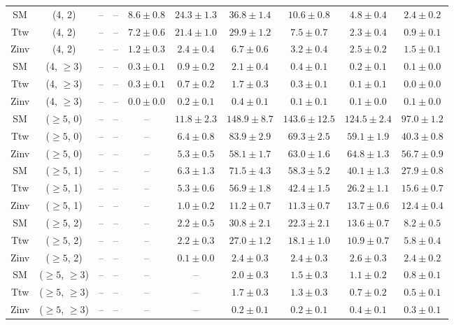 \begin{table}[h!]
{\begin{tabular}{cccccccccc}
	SM & (4, 2) & -- & -- & $8.6\pm 0.8$ & $24.3\pm 1.3$ & $36.8\pm 1.4$ & $10.6\pm 0.8$ & $4.8\pm 0.4$ & $2.4\pm 0.2$ \\[0.5ex] 
	Ttw & (4, 2) & -- & -- & $7.2\pm 0.6$ & $21.4\pm 1.0$ & $29.9\pm 1.2$ & $7.5\pm 0.7$ & $2.3\pm 0.4$ & $0.9\pm 0.1$ \\[0.5ex] 
	Zinv & (4, 2) & -- & -- & $1.2\pm 0.3$ & $2.4\pm 0.4$ & $6.7\pm 0.6$ & $3.2\pm 0.4$ & $2.5\pm 0.2$ & $1.5\pm 0.1$ \\[0.5ex] 
	SM & (4, $\ge3$) & -- & -- & $0.3\pm 0.1$ & $0.9\pm 0.2$ & $2.1\pm 0.4$ & $0.4\pm 0.1$ & $0.2\pm 0.1$ & $0.1\pm 0.0$ \\[0.5ex] 
	Ttw & (4, $\ge3$) & -- & -- & $0.3\pm 0.1$ & $0.7\pm 0.2$ & $1.7\pm 0.3$ & $0.3\pm 0.1$ & $0.1\pm 0.1$ & $0.0\pm 0.0$ \\[0.5ex] 
	Zinv & (4, $\ge3$) & -- & -- & $0.0\pm 0.0$ & $0.2\pm 0.1$ & $0.4\pm 0.1$ & $0.1\pm 0.1$ & $0.1\pm 0.0$ & $0.1\pm 0.0$ \\[0.5ex] 
	SM & ($\ge5$, 0) & -- & -- & -- & $11.8\pm 2.3$ & $148.9\pm 8.7$ & $143.6\pm 12.5$ & $124.5\pm 2.4$ & $97.0\pm 1.2$ \\[0.5ex] 
	Ttw & ($\ge5$, 0) & -- & -- & -- & $6.4\pm 0.8$ & $83.9\pm 2.9$ & $69.3\pm 2.5$ & $59.1\pm 1.9$ & $40.3\pm 0.8$ \\[0.5ex] 
	Zinv & ($\ge5$, 0) & -- & -- & -- & $5.3\pm 0.5$ & $58.1\pm 1.7$ & $63.0\pm 1.6$ & $64.8\pm 1.3$ & $56.7\pm 0.9$ \\[0.5ex] 
	SM & ($\ge5$, 1) & -- & -- & -- & $6.3\pm 1.3$ & $71.5\pm 4.3$ & $58.3\pm 5.2$ & $40.1\pm 1.3$ & $27.9\pm 0.8$ \\[0.5ex] 
	Ttw & ($\ge5$, 1) & -- & -- & -- & $5.3\pm 0.6$ & $56.9\pm 1.8$ & $42.4\pm 1.5$ & $26.2\pm 1.1$ & $15.6\pm 0.7$ \\[0.5ex] 
	Zinv & ($\ge5$, 1) & -- & -- & -- & $1.0\pm 0.2$ & $11.2\pm 0.7$ & $11.3\pm 0.7$ & $13.7\pm 0.6$ & $12.4\pm 0.4$ \\[0.5ex] 
	SM & ($\ge5$, 2) & -- & -- & -- & $2.2\pm 0.5$ & $30.8\pm 2.1$ & $22.3\pm 2.1$ & $13.6\pm 0.7$ & $8.2\pm 0.5$ \\[0.5ex] 
	Ttw & ($\ge5$, 2) & -- & -- & -- & $2.2\pm 0.3$ & $27.0\pm 1.2$ & $18.1\pm 1.0$ & $10.9\pm 0.7$ & $5.8\pm 0.4$ \\[0.5ex] 
	Zinv & ($\ge5$, 2) & -- & -- & -- & $0.1\pm 0.0$ & $2.4\pm 0.3$ & $2.4\pm 0.3$ & $2.6\pm 0.3$ & $2.4\pm 0.2$ \\[0.5ex] 
	SM & ($\ge5$, $\ge3$) & -- & -- & -- & -- & $2.0\pm 0.3$ & $1.5\pm 0.3$ & $1.1\pm 0.2$ & $0.8\pm 0.1$ \\[0.5ex] 
	Ttw & ($\ge5$, $\ge3$) & -- & -- & -- & -- & $1.7\pm 0.3$ & $1.3\pm 0.3$ & $0.7\pm 0.2$ & $0.5\pm 0.1$ \\[0.5ex] 
	Zinv & ($\ge5$, $\ge3$) & -- & -- & -- & -- & $0.2\pm 0.1$ & $0.2\pm 0.1$ & $0.4\pm 0.1$ & $0.3\pm 0.1$ \\[0.5ex] 
	\hline
	\hline
\end{tabular}}
\end{table}

